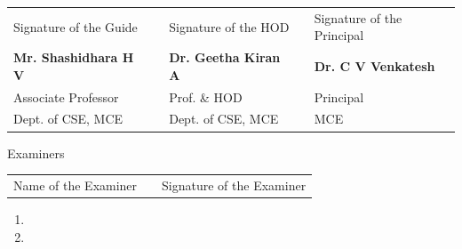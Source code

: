 \vspace{0.25cm}

\begin{table}[h]
\centering
\begin{tabular}{lllll}
Signature of the Guide & & Signature of the HOD & & Signature of the Principal \\
\textbf{Mr. Shashidhara H V}  & & 	\textbf{Dr. Geetha Kiran A} & & \textbf{Dr. C V Venkatesh} \\ 
Associate Professor & &  Prof. \& HOD & & Principal \\
Dept. of CSE, MCE & & Dept. of CSE, MCE & & MCE
\end{tabular}
\end{table}
\vspace{0.5cm}
\begin{center}
Examiners
\end{center}
\vspace{-0.75cm}
\begin{table}[h]
\centering
\begin{tabular}{lll}
Name of the Examiner & \hspace{4cm}  & Signature of the Examiner
\end{tabular}
\end{table}
\vspace{-0.75cm}
\begin{enumerate}
\item  \vspace{0.25cm}
\item
\end{enumerate}
